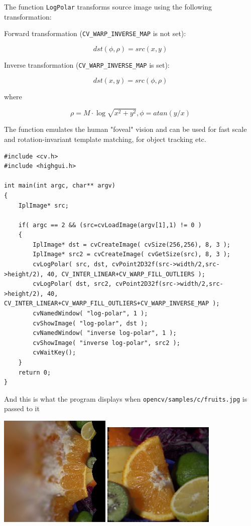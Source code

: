 The function \texttt{LogPolar} transforms source image using the following transformation:

Forward transformation (\texttt{CV\_WARP\_INVERSE\_MAP} is not set):

\[
dst(\phi,\rho) = src(x,y)
\]

Inverse transformation (\texttt{CV\_WARP\_INVERSE\_MAP} is set):

\[
dst(x,y) = src(\phi,\rho)
\]

where

\[
\rho = M \cdot \log{\sqrt{x^2 + y^2}},
\phi=atan(y/x)
\]

The function emulates the human "foveal" vision and can be used for fast scale and rotation-invariant template matching, for object tracking etc.

\begin{lstlisting}
#include <cv.h>
#include <highgui.h>

int main(int argc, char** argv)
{
    IplImage* src;

    if( argc == 2 && (src=cvLoadImage(argv[1],1) != 0 )
    {
        IplImage* dst = cvCreateImage( cvSize(256,256), 8, 3 );
        IplImage* src2 = cvCreateImage( cvGetSize(src), 8, 3 );
        cvLogPolar( src, dst, cvPoint2D32f(src->width/2,src->height/2), 40, CV_INTER_LINEAR+CV_WARP_FILL_OUTLIERS );
        cvLogPolar( dst, src2, cvPoint2D32f(src->width/2,src->height/2), 40, CV_INTER_LINEAR+CV_WARP_FILL_OUTLIERS+CV_WARP_INVERSE_MAP );
        cvNamedWindow( "log-polar", 1 );
        cvShowImage( "log-polar", dst );
        cvNamedWindow( "inverse log-polar", 1 );
        cvShowImage( "inverse log-polar", src2 );
        cvWaitKey();
    }
    return 0;
}
\end{lstlisting}

And this is what the program displays when \texttt{opencv/samples/c/fruits.jpg} is passed to it

\includegraphics[width=0.4\textwidth]{pics/logpolar.jpg}
\includegraphics[width=0.4\textwidth]{pics/inv_logpolar.jpg}


